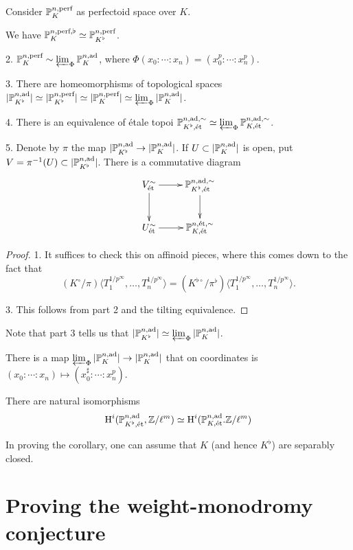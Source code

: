 \documentclass{article}
\begin{document}
Consider $\mathbb{P}_K^{n,\textnormal{perf}}$ as perfectoid space over $K$. 

\begin{theorem}
We have $\mathbb{P}_K^{n,\textnormal{perf},\flat} \simeq \mathbb{P}_{K^\flat}^{n,\textnormal{perf}}$. 

2. $\mathbb{P}_K^{n,\textnormal{perf}} \sim \varprojlim_\Phi \mathbb{P}_K^{n,\textnormal{ad}}$, where 
$\Phi(x_0:\cdots:x_n) = (x_0^p:\cdots:x_n^p)$. 

3. There are homeomorphisms of topological spaces 
$|\mathbb{P}_{K^\flat}^{n,\textnormal{ad}}| \simeq |\mathbb{P}_{K^\flat}^{n,\textnormal{perf}}|\simeq |\mathbb{P}_K^{n,\textnormal{perf}}| \simeq \varprojlim_\Phi |\mathbb{P}_K^{n,\textnormal{ad}}|$. 

4. There is an equivalence of \'etale topoi 
$\mathbb{P}_{K^\flat,\textnormal{\'et}}^{n,\textnormal{ad},\sim}\simeq \varprojlim_\Phi \mathbb{P}_{K,\textnormal{\'et}}^{n,\textnormal{ad},\sim}$. 

5. Denote by $\pi$ the map 
$|\mathbb{P}_{K^\flat}^{n,\textnormal{ad}} \to |\mathbb{P}_K^{n,\textnormal{ad}}|$. If 
$U\subset |\mathbb{P}_K^{n,\textnormal{ad}}|$ is open,  put $V=\pi^{-1}(U)\subset |\mathbb{P}_{K^\flat}^{n,\textnormal{ad}}|$.
There is a commutative diagram 
\[\xymatrix{
  V_\et^\sim \ar[r] \ar[d] 
    & \dP_{K^\flat,\et}^{n,\ad,\sim} \ar[d] \\
  U_\et^\sim \ar[r] 
    & \dP_{K,\et}^{n,\et,\sim} 
 }\] 
\end{theorem}
\begin{proof}
1. It suffices to check this on affinoid pieces, where this comes down to the 
fact that 
\[
  (K^\circ/\pi)\langle T_1^{1/p^\infty},\dots,T_n^{1/p^\infty}\rangle = (K^{\flat \circ}/\pi^\flat) \langle T_1^{1/p^\infty},\dots,T_n^{1/p^\infty}\rangle . 
\]

3. This follows from part 2 and the tilting equivalence. 
\end{proof}

Note that part 3 tells us that $|\mathbb{P}_{K^\flat}^{n,\textnormal{ad}}|\simeq \varprojlim_\Phi |\mathbb{P}_K^{n,\textnormal{ad}}|$. 

There is a map $\varprojlim_\Phi |\mathbb{P}_K^{n,\textnormal{ad}}| \to |\mathbb{P}_K^{n,\textnormal{ad}}|$ that on 
coordinates is $(x_0:\cdots:x_n)\mapsto (x_0^\sharp:\cdots : x_n^p)$. 

\begin{corollary}
There are natural isomorphisms 
\[
  \operatorname{H}^i(\mathbb{P}_{K^\flat,\textnormal{\'et}}^{n,\textnormal{ad}},\mathbb{Z}/\ell^m) \simeq \operatorname{H}^i(\mathbb{P}_{K,\textnormal{\'et}}^{n,\textnormal{ad}}.\mathbb{Z}/\ell^m) 
\]
\end{corollary}
In proving the corollary, one can assume that $K$ (and hence $K^\flat$) are 
separably closed. 





\section{Proving the weight-monodromy conjecture}
\end{document}
